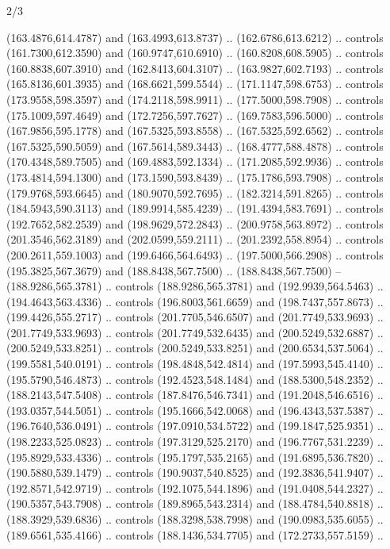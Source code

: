 \begin{flagdescription}{2/3}
\begin{scope}[shift={(0.5\flaglength,0.5)},scale=\flagwidth/545]
\begin{scope}[y=0.80pt, x=0.80pt, yscale=-1,shift={(-297,-430)}]
\begin{scope}[shift={(28.51887,-25.61095)}]
  (163.4876,614.4787) and (163.4993,613.8737) .. (162.6786,613.6212) .. controls
  (161.7300,612.3590) and (160.9747,610.6910) .. (160.8208,608.5905) .. controls
  (160.8838,607.3910) and (162.8413,604.3107) .. (163.9827,602.7193) .. controls
  (165.8136,601.3935) and (168.6621,599.5544) .. (171.1147,598.6753) .. controls
  (173.9558,598.3597) and (174.2118,598.9911) .. (177.5000,598.7908) .. controls
  (175.1009,597.4649) and (172.7256,597.7627) .. (169.7583,596.5000) .. controls
  (167.9856,595.1778) and (167.5325,593.8558) .. (167.5325,592.6562) .. controls
  (167.5325,590.5059) and (167.5614,589.3443) .. (168.4777,588.4878) .. controls
  (170.4348,589.7505) and (169.4883,592.1334) .. (171.2085,592.9936) .. controls
  (173.4814,594.1300) and (173.1590,593.8439) .. (175.1786,593.7908) .. controls
  (179.9768,593.6645) and (180.9070,592.7695) .. (182.3214,591.8265) .. controls
  (184.5943,590.3113) and (189.9914,585.4239) .. (191.4394,583.7691) .. controls
  (192.7652,582.2539) and (198.9629,572.2843) .. (200.9758,563.8972) .. controls
  (201.3546,562.3189) and (202.0599,559.2111) .. (201.2392,558.8954) .. controls
  (200.2611,559.1003) and (199.6466,564.6493) .. (197.5000,566.2908) .. controls
  (195.3825,567.3679) and (188.8438,567.7500) .. (188.8438,567.7500) --
  (188.9286,565.3781) .. controls (188.9286,565.3781) and (192.9939,564.5463) ..
  (194.4643,563.4336) .. controls (196.8003,561.6659) and (198.7437,557.8673) ..
  (199.4426,555.2717) .. controls (201.7705,546.6507) and (201.7749,533.9693) ..
  (201.7749,533.9693) .. controls (201.7749,532.6435) and (200.5249,532.6887) ..
  (200.5249,533.8251) .. controls (200.5249,533.8251) and (200.6534,537.5064) ..
  (199.5581,540.0191) .. controls (198.4848,542.4814) and (197.5993,545.4140) ..
  (195.5790,546.4873) .. controls (192.4523,548.1484) and (188.5300,548.2352) ..
  (188.2143,547.5408) .. controls (187.8476,546.7341) and (191.2048,546.6516) ..
  (193.0357,544.5051) .. controls (195.1666,542.0068) and (196.4343,537.5387) ..
  (196.7640,536.0491) .. controls (197.0910,534.5722) and (199.1847,525.9351) ..
  (198.2233,525.0823) .. controls (197.3129,525.2170) and (196.7767,531.2239) ..
  (195.8929,533.4336) .. controls (195.1797,535.2165) and (191.6895,536.7820) ..
  (190.5880,539.1479) .. controls (190.9037,540.8525) and (192.3836,541.9407) ..
  (192.8571,542.9719) .. controls (192.1075,544.1896) and (191.0408,544.2327) ..
  (190.5357,543.7908) .. controls (189.8965,543.2314) and (188.4784,540.8818) ..
  (188.3929,539.6836) .. controls (188.3298,538.7998) and (190.0983,535.6055) ..
  (189.6561,535.4166) .. controls (188.1436,534.7705) and (172.2733,557.5159) ..

\end{scope}
\end{scope}
\end{scope}
\end{flagdescription}

